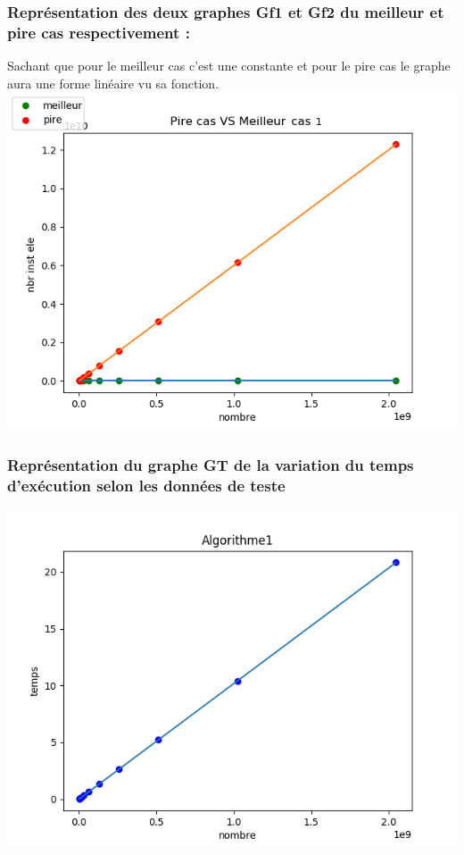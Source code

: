 \documentclass[12pt]{article}
\begin{document}
\subsubsection{Représentation des deux graphes Gf1 et Gf2 du meilleur et pire cas respectivement :}
Sachant que pour le meilleur cas c'est une constante et pour le pire cas le graphe aura une forme linéaire vu sa fonction.
\\
\includegraphics[width=1\textwidth]{graphe/Pire_VS_Meilleur_cas1.png}

\subsubsection{Représentation du graphe GT de la variation du temps d'exécution selon les données de teste}

\includegraphics[width=1\textwidth]{graphe/Algorithme1.png}
\end{document}

